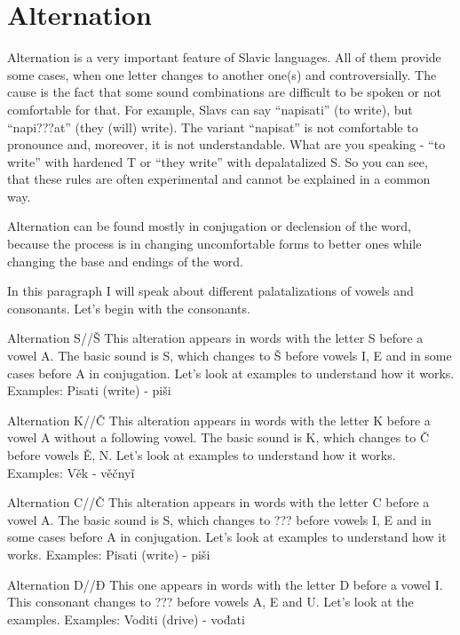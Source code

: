\section{Alternation}

Alternation is a very important feature of Slavic languages. All of them provide some cases, when one letter changes to another one(s) and controversially. The cause is the fact that some sound combinations are difficult to be spoken or not comfortable for that. For example, Slavs can say “napisati” (to write), but “napi???at” (they (will) write). The variant “napisat” is not comfortable to pronounce and, moreover, it is not understandable. What are you speaking - “to write” with hardened T or “they write” with depalatalized S. So you can see, that these rules are often experimental and cannot be explained in a common way.

Alternation can be found mostly in conjugation or declension of the word, because the process is in changing uncomfortable forms to better ones while changing the base and endings of the word. 

In this paragraph I will speak about different palatalizations of vowels and consonants. Let’s begin with the consonants.

Alternation S//Š
This alteration appears in words with the letter S before a vowel A. The basic sound is S, which changes to Š before vowels I, E and in some cases before A in conjugation. Let’s look at examples to understand how it works.
Examples:
Pisati (write) \textipa{[’pisat1]} - piši \textipa{[pi’\:s1]}



Alternation K//Č
This alteration appears in words with the letter K before a vowel A without a following vowel. The basic sound is K, which changes to Č before vowels Ě, N. Let’s look at examples to understand how it works.
Examples:
Věk \textipa{[’pisat1]} - věčnyǐ \textipa{[pi’\:s1]}



Alternation C//Č
This alteration appears in words with the letter C before a vowel A. The basic sound is S, which changes to ??? before vowels I, E and in some cases before A in conjugation. Let’s look at examples to understand how it works.
Examples:
Pisati (write) \textipa{[’pisat1]} - piši \textipa{[pi’\:s1]}


Alternation D//Đ
 This one appears in words with the letter D before a vowel I. This consonant changes to ??? before vowels A, E and U. Let’s look at the examples.
Examples:
Voditi (drive) \textipa{[‘vodit1]} - vođati 


